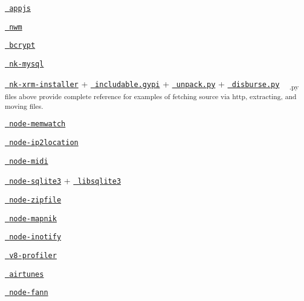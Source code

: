 \begin{DoxyItemize}
\item \href{https://github.com/milani/appjs/blob/master/binding.gyp}{\texttt{ appjs}}
\item \href{https://github.com/mixu/nwm/blob/master/binding.gyp}{\texttt{ nwm}}
\item \href{https://github.com/ncb000gt/node.bcrypt.js/blob/master/binding.gyp}{\texttt{ bcrypt}}
\item \href{https://github.com/mmod/nodamysql/blob/master/binding.gyp}{\texttt{ nk-\/mysql}}
\item \href{https://github.com/mmod/nk-xrm-installer/blob/master/binding.gyp}{\texttt{ nk-\/xrm-\/installer}} + \href{https://github.com/mmod/nk-xrm-installer/blob/master/includable.gypi}{\texttt{ includable.\+gypi}} + \href{https://github.com/mmod/nk-xrm-installer/blob/master/unpack.py}{\texttt{ unpack.\+py}} + \href{https://github.com/mmod/nk-xrm-installer/blob/master/disburse.py}{\texttt{ disburse.\+py}} ~\newline
 \textsubscript{.py files above provide complete reference for examples of fetching source via http, extracting, and moving files.}
\item \href{https://github.com/lloyd/node-memwatch/blob/master/binding.gyp}{\texttt{ node-\/memwatch}}
\item \href{https://github.com/bolgovr/node-ip2location/blob/master/binding.gyp}{\texttt{ node-\/ip2location}}
\item \href{https://github.com/justinlatimer/node-midi/blob/master/binding.gyp}{\texttt{ node-\/midi}}
\item \href{https://github.com/developmentseed/node-sqlite3/blob/master/binding.gyp}{\texttt{ node-\/sqlite3}} + \href{https://github.com/developmentseed/node-sqlite3/blob/master/deps/sqlite3.gyp}{\texttt{ libsqlite3}}
\item \href{https://github.com/mapbox/node-zipfile/blob/master/binding.gyp}{\texttt{ node-\/zipfile}}
\item \href{https://github.com/mapnik/node-mapnik/blob/master/binding.gyp}{\texttt{ node-\/mapnik}}
\item \href{https://github.com/c4milo/node-inotify/blob/master/binding.gyp}{\texttt{ node-\/inotify}}
\item \href{https://github.com/c4milo/v8-profiler/blob/master/binding.gyp}{\texttt{ v8-\/profiler}}
\item \href{https://github.com/radioline/node_airtunes/blob/master/binding.gyp}{\texttt{ airtunes}}
\item \href{https://github.com/c4milo/node-fann/blob/master/binding.gyp}{\texttt{ node-\/fann}}

\end{DoxyItemize}
